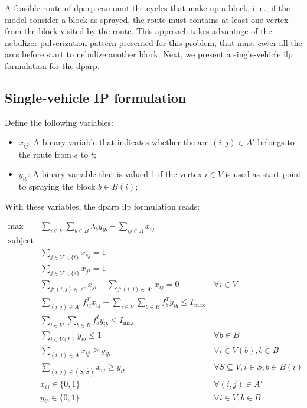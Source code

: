 \documentclass[a4paper,11pt]{article}
\begin{document}
A feasible route of \gls{dparp} can omit the cycles that make up a block, i. e.,
if the model consider  a block as sprayed, the route must  contains at least one
vertex from the block visited by the route. This approach takes advantage of the
nebulizer pulverization pattern presented for  this problem, that must cover all
the  arcs  before  start  to  nebulize   another  block.  Next,  we  present  a
single-vehicle \gls{ilp} formulation for the \gls{dparp}.

\newpage
\subsection{Single-vehicle IP formulation}

Define the following variables:

\begin{itemize}
  \item $x_{ij}$: A binary variable that indicates whether the arc $(i, j) \in
    A'$ belongs to the route from $s$ to $t$;
  \item $y_{ib}$: A binary variable that is valued 1 if the vertex $i \in V$ is
    used as start point to spraying the block $b \in B(i)$; 
\end{itemize}
With these variables, the \gls{dparp} \gls{ilp} formulation reads:

\begin{align}
  \max & \sum_{i \in V} \sum_{b \in B} \lambda_b y_{ib} - \sum_{ij \in A} x_{ij} & \label{eq:of}\\
  \nonumber \text{subject to:} & & \\
       & \sum_{j \in V'\backslash \{t\}} x_{sj} = 1 & \label{eq:s-all} \\
       & \sum_{j \in V'\backslash \{s\}} x_{jt} = 1 & \label{eq:all-t} \\
       & \sum_{j: (i, j) \in A'} x_{ji} - \sum_{j: (i, j) \in A'} x_{ij} = 0 & \ \forall i \in V \label{eq:flow-conservation} \\
       & \sum_{(i, j) \in A'} f^T_{ij} x_{ij} + \sum_{i \in V} \sum_{b \in B} f^T_b y_{ib} \leq T_{\max} & \label{eq:max-time} \\
       & \sum_{i \in V'} \sum_{b \in B} f^I_b y_{ib} \leq I_{\max} & \label{eq:max-insecticide} \\
       & \sum_{i \in V(b)} y_{ib} \leq 1 & \ \forall b \in B \label{eq:max-attend} \\
       & \sum_{(i, j) \in A} x_{ij} \geq y_{ib} & \ \forall i \in V(b), b \in B \label{eq:in-path} \\
       & \sum_{(i, j) \in (S, \bar{S})} x_{ij} \geq y_{ib} & \ \forall S \subseteq V, i \in S, b \in B(i) \label{eq:subtour-elimination} \\
       & x_{ij} \in \{0, 1\} & \ \forall (i, j) \in A' \label{eq:dom-x} \\
       & y_{ib} \in \{0, 1\} & \ \forall i \in V, b \in B. \label{eq:dom-y} 
\end{align}
\end{document}
